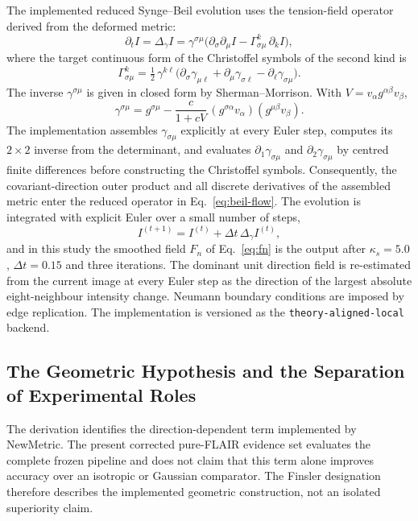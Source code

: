 \documentclass[11pt,a4paper]{article}
\begin{document}
The implemented reduced Synge--Beil evolution uses the tension-field operator
derived from the deformed metric:
\begin{equation}
\partial_t I=\Delta_\gamma I
=\gamma^{\sigma\mu}\Big(\partial_\sigma\partial_\mu I-\Gamma^{k}_{\sigma\mu}\,\partial_k I\Big),
\label{eq:beil-flow}
\end{equation}
where the target continuous form of the Christoffel symbols of the second kind is
\begin{equation}
\Gamma^{k}_{\sigma\mu}=\tfrac12\,\gamma^{k\ell}\big(\partial_\sigma\gamma_{\mu\ell}+\partial_\mu\gamma_{\sigma\ell}-\partial_\ell\gamma_{\sigma\mu}\big).
\label{eq:christoffel}
\end{equation}
The inverse $\gamma^{\sigma\mu}$ is given in closed form by Sherman--Morrison. With
$V=v_\alpha g^{\alpha\beta}v_\beta$,
\begin{equation}
\gamma^{\sigma\mu}=g^{\sigma\mu}
-\frac{c}{1+cV}\,(g^{\sigma\alpha}v_\alpha)(g^{\mu\beta}v_\beta).
\end{equation}
The implementation assembles $\gamma_{\sigma\mu}$ explicitly at every Euler
step, computes its $2\times2$ inverse from the determinant, and evaluates
$\partial_1\gamma_{\sigma\mu}$ and $\partial_2\gamma_{\sigma\mu}$ by centred
finite differences before constructing the Christoffel symbols. Consequently,
the covariant-direction outer product and all discrete derivatives of the
assembled metric enter the reduced operator in Eq.~\eqref{eq:beil-flow}.
The evolution is integrated with explicit Euler over a small number of steps,
\begin{equation}
I^{(t+1)}=I^{(t)}+\Delta t\,\Delta_\gamma I^{(t)},
\label{eq:euler}
\end{equation}
and in this study the smoothed field $F_n$ of Eq.~\eqref{eq:fn} is the output after
$\kappa_s=5.0$, $\Delta t=0.15$ and three iterations. The dominant unit direction
field is re-estimated from the current image at every Euler step as the direction
of the largest absolute eight-neighbour intensity change. Neumann boundary
conditions are imposed by edge replication. The implementation is versioned as
the \texttt{theory-aligned-local} backend.

\subsection{The Geometric Hypothesis and the Separation of Experimental Roles}\label{sec:theory-positioning}

The derivation identifies the direction-dependent term implemented by NewMetric.
The present corrected pure-FLAIR evidence set evaluates the complete frozen
pipeline and does not claim that this term alone improves accuracy over an
isotropic or Gaussian comparator. The Finsler designation therefore describes
the implemented geometric construction, not an isolated superiority claim.
\end{document}

